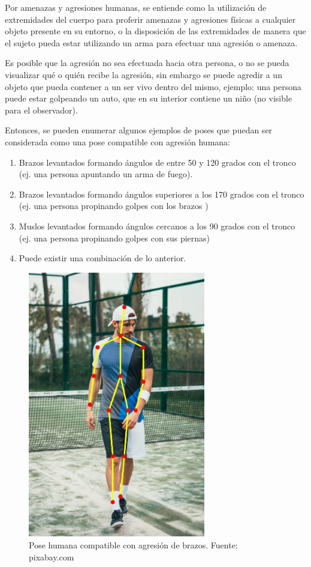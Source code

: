 \documentclass[a4paper,12pt,twoside]{article}
\begin{document}
Por amenazas y agresiones humanas, se entiende como la utilización de extremidades del cuerpo para proferir amenazas y agresiones físicas a cualquier objeto presente en su entorno, o la disposición de las extremidades de manera que el sujeto pueda estar utilizando un arma para efectuar una agresión o amenaza. \par 

Es posible que la agresión no sea efectuada hacia otra persona, o no se pueda visualizar qué o quién recibe la agresión, sin embargo se puede agredir a un objeto que pueda contener a un ser vivo dentro del mismo, ejemplo: una persona puede estar golpeando un auto, que en su interior contiene un niño (no visible para el observador).\par

Entonces, se pueden enumerar algunos ejemplos de poses que puedan ser considerada como una pose compatible con agresión humana:

\begin{enumerate}
	\baselineskip 0pt
	\item Brazos levantados formando ángulos de entre 50 y 120 grados con el tronco (ej. una persona apuntando un arma de fuego). \\	
	\item Brazos levantados formando ángulos superiores a los 170 grados con el tronco (ej. una persona propinando golpes con los brazos ) \\
	\item Muslos levantados formando ángulos cercanos a los 90 grados con el tronco (ej. una persona propinando golpes con sus piernas) \\
	\item Puede existir una combinación de lo anterior. \\
\end{enumerate}	\baselineskip 14pt

\begin{figure}[h!]
	\includegraphics[width=220pt]{Imagenes/pose3.jpg}
	\caption{Pose humana compatible con agresión de brazos. Fuente: pixabay.com}
	\label{fig:pose3}
\end{figure}
\end{document}

